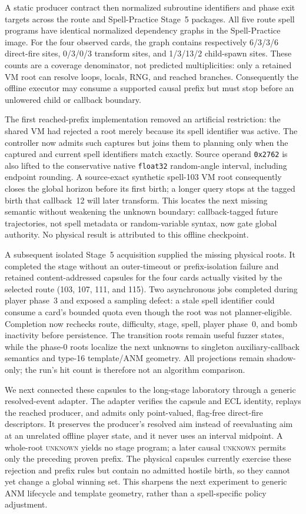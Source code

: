 \documentclass[10pt]{article}
\newcommand{\unknown}{\textsc{unknown}}
\begin{document}
A static producer contract then normalized subroutine identifiers and phase
exit targets across the route and Spell-Practice Stage~5 packages.  All five
route spell programs have identical normalized dependency graphs in the
Spell-Practice image.  For the four
observed cards, the graph contains respectively 6/3/3/6 direct-fire sites,
0/3/0/3 transform sites, and 1/3/13/2 child-spawn sites.  These counts are a
coverage denominator, not predicted multiplicities: only a retained VM root
can resolve loops, locals, RNG, and reached branches.  Consequently the
offline executor may consume a supported causal prefix but must stop before an
unlowered child or callback boundary.

The first reached-prefix implementation removed an artificial restriction:
the shared VM had rejected a root merely because its spell identifier was
active.  The controller now admits such captures but joins them to planning
only when the captured and current spell identifiers match exactly.  Source
operand \texttt{0x2762} is also lifted to the conservative native
\texttt{float32} random-angle interval, including endpoint rounding.  A
source-exact synthetic spell-103 VM root consequently closes the global
horizon before its first birth; a longer query stops at the tagged birth that
callback~12 will later transform.  This locates the next missing semantic
without weakening the unknown boundary: callback-tagged future trajectories,
not spell metadata or random-variable syntax, now gate global authority.  No
physical result is attributed to this offline checkpoint.

A subsequent isolated Stage~5 acquisition supplied the missing physical
roots.  It completed the stage without an outer-timeout or prefix-isolation
failure and retained content-addressed capsules for the four cards actually
visited by the selected route (103, 107, 111, and 115).  Two asynchronous jobs
completed during player phase~3 and exposed a sampling defect: a stale spell
identifier could consume a card's bounded quota even though the root was not
planner-eligible.  Completion now rechecks route, difficulty, stage, spell,
player phase~0, and bomb inactivity before persistence.  The transition roots
remain useful fuzzer states, while the phase-0 roots localize the next unknowns
to singleton auxiliary-callback semantics and type-16 template/ANM geometry.
All projections remain shadow-only; the run's hit count is therefore not an
algorithm comparison.

We next connected these capsules to the long-stage laboratory through a
generic resolved-event adapter.  The adapter verifies the capsule and ECL
identity, replays the reached producer, and admits only point-valued,
flag-free direct-fire descriptors.  It preserves the producer's resolved aim
instead of reevaluating aim at an unrelated offline player state, and it never
uses an interval midpoint.  A whole-root \unknown{} yields no stage program;
a later causal \unknown{} permits only the preceding proven prefix.  The
physical capsules currently exercise these rejection and prefix rules but
contain no admitted hostile birth, so they cannot yet change a global winning
set.  This sharpens the next experiment to generic ANM lifecycle and template
geometry, rather than a spell-specific policy adjustment.
\end{document}
